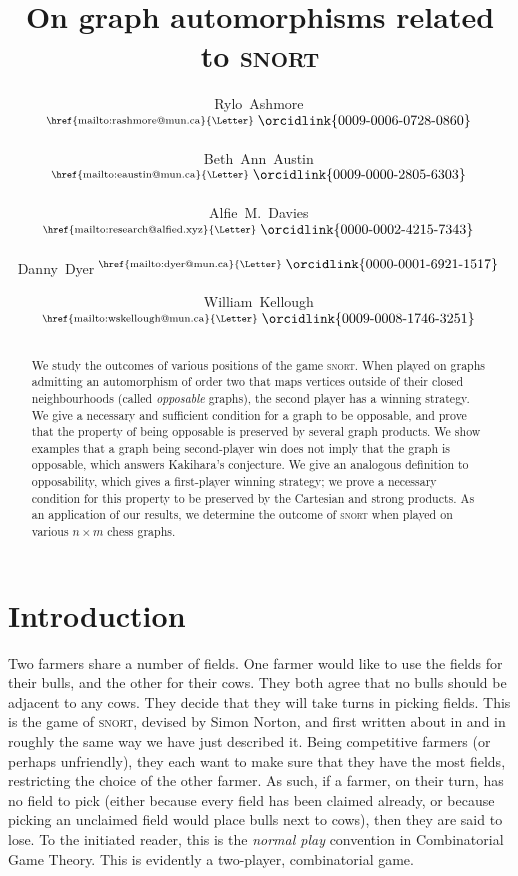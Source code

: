 \documentclass[11pt]{article}
\theoremstyle{definition}
\newcommand{\authDetails}[3]{\author{\mbox{#1\,$^{\textrm{\href{mailto:#2}{\Letter}}\,\,\raisebox{-0.2ex}{\orcidlink{#3}}\,}$}}}
\begin{document}
\title{On graph automorphisms related to \textsc{snort}}

\authDetails{Rylo Ashmore}{rashmore@mun.ca}{0009-0006-0728-0860}
\authDetails{Beth Ann Austin}{eaustin@mun.ca}{0009-0000-2805-6303}
\authDetails{Alfie M. Davies}{research@alfied.xyz}{0000-0002-4215-7343}
\authDetails{Danny Dyer}{dyer@mun.ca}{0000-0001-6921-1517}
\authDetails{William Kellough}{wskellough@mun.ca}{0009-0008-1746-3251}

\date{}

\maketitle

\begin{abstract}
    \noindent
    We study the outcomes of various positions of the game \textsc{snort}. When
    played on graphs admitting an automorphism of order two that maps vertices
    outside of their closed neighbourhoods (called \emph{opposable} graphs),
    the second player has a winning strategy. We give a necessary and
    sufficient condition for a graph to be opposable, and prove that the
    property of being opposable is preserved by several graph products. We show
    examples that a graph being second-player win does not imply that the graph
    is opposable, which answers Kakihara's conjecture. We give an analogous
    definition to opposability, which gives a first-player winning strategy; we
    prove a necessary condition for this property to be preserved by the
    Cartesian and strong products. As an application of our results, we
    determine the outcome of \textsc{snort} when played on various $n\times m$
    chess graphs.
\end{abstract}

\section{Introduction}

Two farmers share a number of fields. One farmer would like to use the fields
for their bulls, and the other for their cows. They both agree that no bulls
should be adjacent to any cows. They decide that they will take turns in
picking fields. This is the game of \textsc{snort}, devised by Simon Norton,
and first written about in \cite[pp.~91--92]{conway:onag} and
\cite[pp.~145--147]{berlekamp.conway.guy:wwv1} in roughly the same way we have
just described it. Being competitive farmers (or perhaps unfriendly), they each
want to make sure that they have the most  fields, restricting the choice of
the other farmer. As such, if a farmer, on their turn, has no field to pick
(either because every field has been claimed already, or because picking an
unclaimed field would place bulls next to cows), then they are said to lose. To
the initiated reader, this is the \emph{normal play} convention in
Combinatorial Game Theory. This is evidently a two-player, combinatorial game.
\end{document}
